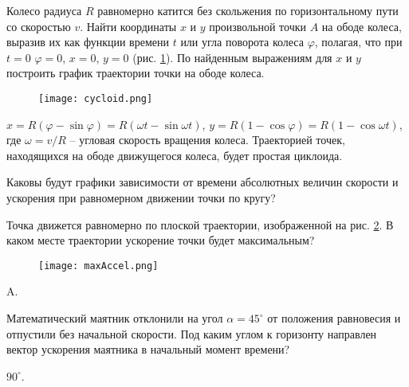 \begin{ex} %
Колесо радиуса $R$ равномерно катится без скольжения по горизонтальному пути со скоростью $v$. Найти координаты $x$ и $y$ произвольной точки $A$ на ободе колеса, выразив их как функции времени $t$ или угла поворота колеса $\varphi$, полагая, что при $t = 0$ $\varphi = 0$, $x = 0$, $y = 0$ (рис. \ref{cycloid}). По найденным выражениям для $x$ и $y$ построить график траектории точки на ободе колеса.

\begin{figure}[h]
\centering
\texttt{[image: cycloid.png]}
\caption{}
\label{cycloid}
\end{figure}

\begin{ans}
$x= R(\varphi - \sin \varphi) = R(\omega t - \sin \omega t)$, $y=R(1-\cos \varphi) = R(1-\cos \omega t)$, где $\omega = v/R$ -- угловая скорость вращения колеса. Траекторией точек, находящихся на ободе движущегося колеса, будет простая циклоида.
\end{ans}
\end{ex}

\qualProblems

\begin{ex} %
Каковы будут графики зависимости от времени абсолютных величин скорости и ускорения при равномерном движении точки по кругу?
\end{ex}

\begin{ex} %
Точка движется равномерно по плоской траектории, изображенной на рис. \ref{maxAccel}. В каком месте траектории ускорение точки будет максимальным?

\begin{figure}[h]
\centering
\texttt{[image: maxAccel.png]}
\caption{}
\label{maxAccel}
\end{figure}
\begin{ans}
A.
\end{ans}
\end{ex}

\begin{ex} %
Математический маятник отклонили на угол $\alpha = 45^{\circ}$ от положения равновесия и отпустили без начальной скорости. Под каким углом к горизонту направлен вектор ускорения маятника в начальный момент времени?
\begin{ans}
$90^{\circ}$.
\end{ans}
\end{ex}

